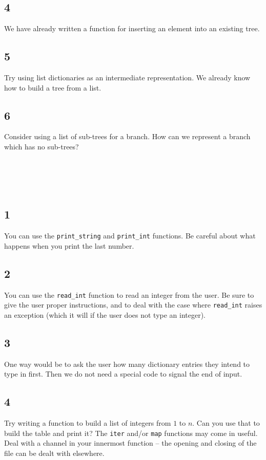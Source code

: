 \documentclass[]{book}
\begin{document}
\begin{multicols*}{2}
\subsection*{4}
We have already written a function for inserting an element into an existing tree.

\subsection*{5}
Try using list dictionaries as an intermediate representation. We already know how to build a tree from a list.

\subsection*{6}
Consider using a list of sub-trees for a branch. How can we represent a branch which has no sub-trees?

\section*{\\ }
\subsection*{1}
You can use the \texttt{print\_string} and \texttt{print\_int} functions. Be careful about what happens when you print the last number.

\subsection*{2}
{\begin{sloppypar}You can use the \texttt{read\_int} function to read an integer from the user. Be sure to give the user proper instructions, and to deal with the case where \texttt{read\_int} raises an exception (which it will if the user does not type an integer).\end{sloppypar}}

\subsection*{3}
One way would be to ask the user how many dictionary entries they intend to type in first. Then we do not need a special code to signal the end of input.

\subsection*{4}
Try writing a function to build a list of integers from $1$ to $n$. Can you use that to build the table and print it? The \texttt{iter} and/or \texttt{map} functions may come in useful. Deal with a channel in your innermost function -- the opening and closing of the file can be dealt with elsewhere.


\end{multicols*}
\end{document}

